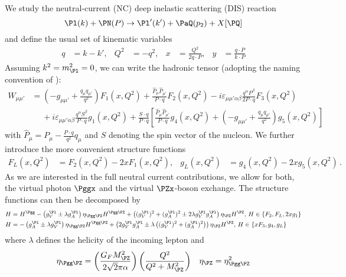 We study the neutral-current (NC) deep inelastic scattering (DIS) reaction
\begin{equation}
\Pl(k) + \PN(P) \to \Pl'(k') + \PaQ(p_2) + X[\PQ]
\end{equation}
and define the usual set of kinematic variables
\begin{align}
q &= k - k', &Q^2 &= -q^2, &x &= \frac{Q^2}{2q\cdot P}, &y &= \frac{q\cdot P}{k\cdot P}
\end{align}
Assuming $k^2 = m_{\Pl}^2 = 0$, we can write the hadronic tensor (adopting the naming convention of \cite{Patrignani:2016xqp}):
\begin{align}
W_{\mu\mu'} &= \left(-g_{\mu\mu'} + \frac{q_\mu q_{\mu'}}{q^2}\right) F_1(x,Q^2) + \frac{\hat P_\mu \hat P_{\mu'}}{P\cdot q} F_2(x,Q^2) - i\varepsilon_{\mu\mu'\alpha\beta} \frac{q^\alpha P^\beta}{2P\cdot q} F_3(x,Q^2) \nonumber\\
 &\hspace{15pt} + i\varepsilon_{\mu\mu'\alpha\beta} \frac{q^\alpha S^\beta}{P\cdot q} g_1(x,Q^2) + \frac{S\cdot q}{P\cdot q}\left[\frac{\hat P_\mu \hat P_{\mu'}}{P\cdot q} g_4(x,Q^2) + \left(-g_{\mu\mu'} + \frac{q_\mu q_{\mu'}}{q^2}\right) g_5(x,Q^2)\right] \label{eq:HadroTen}
\end{align}
with $\hat P_\mu = P_\mu - \frac{P\cdot q}{q^2}q_\mu$ and $S$ denoting the spin vector of the nucleon. We further introduce the more convenient structure functions
\begin{align}
F_L(x,Q^2) &= F_2(x,Q^2) - 2xF_1(x,Q^2), &g_L(x,Q^2) &= g_4(x,Q^2) - 2xg_5(x,Q^2)\,.
\end{align}
As we are interested in the full neutral current contributions, we allow for both, the virtual photon $\Pggx$ and the virtual $\PZx$-boson exchange. The structure functions can then be decomposed by
\begin{align}
H &= H^{\Pgg} - \left(g_V^{\Pl} \pm \lambda g_A^{\Pl}\right) \eta_{\Pgg\PZ} H^{\Pgg\PZ} + \left((g_V^{\Pl})^2 + (g_A^{\Pl})^2 \pm 2\lambda g_{V}^{\Pl}g_{A}^{\Pl}\right)\eta_{\PZ} H^{\PZ},\,H\in\{F_2,F_L,2xg_1\}\\
H &= - \left(g_A^{\Pl} \pm \lambda g_V^{\Pl}\right) \eta_{\Pgg\PZ} H^{\Pgg\PZ} + \left(2g_{V}^{\Pl}g_{A}^{\Pl} \pm \lambda\left((g_V^{\Pl})^2 + (g_A^{\Pl})^2 \right) \right)\eta_{\PZ} H^{\PZ},\,H\in\{xF_3,g_4,g_L\}
\end{align}
where $\lambda$ defines the helicity of the incoming lepton and
\begin{align}
\eta_{\Pgg\PZ} &=\left(\frac{G_F M_{\PZ}^2}{2\sqrt 2 \pi \alpha}\right)\left(\frac{Q^2}{Q^2+M_{\PZ}^2}\right)  &\eta_{\PZ} =\eta_{\Pgg\PZ}^2
\end{align}

